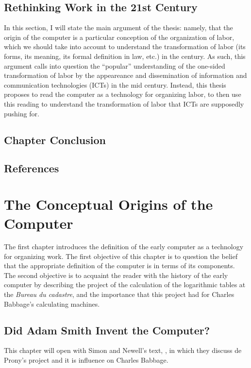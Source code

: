 \documentclass[version=last,draft=false,paper=A4,portrait,twoside=true,twocolumn=true,headinclude=false,footinclude=false,fontsize=12,BCOR=20mm,DIV=13,pagesize=auto,titlepage=firstiscover,mpinclude=false,open=right,chapterprefix=true,numbers=autoendperiod,headsepline=false,parskip=false]{scrbook}
\begin{document}
\section{Rethinking Work in the 21st Century}
\label{sec:orgb75519b}
In this section, I will state the main argument of the thesis: namely, that
the origin of the computer is a particular conception of the organization
of labor, which we should take into account to understand the transformation
of labor (its forms, its meaning, its formal definition in law, etc.) in the
 century. As such, this argument calls into question the ``popular''
understanding of the one-sided transformation of labor by the appeareance
and dissemination of information and communication technologies (ICTs) in
the mid  century. Instead, this thesis proposes to read the
computer as a technology for organizing labor, to then use this reading to
understand the transformation of labor that ICTs are supposedly pushing
for. 

\section{Chapter Conclusion}
\label{sec:orgd1898f5}
\section*{References}
\printbibliography[heading=none,keyword=chapter-1]
\chapter{The Conceptual Origins of the Computer}
\label{sec:orgf7ad317}
The first chapter introduces the definition of the early computer as a
technology for organizing work. The first objective of this chapter is to
question the belief that the appropriate definition of the computer is in
terms of its components. The second objective is to acquaint the reader
with the history of the early computer by describing the project of the
calculation of the logarithmic tables at the \emph{Bureau du cadastre}, and the
importance that this project had for Charles Babbage's calculating
machines.
\section{Did Adam Smith Invent the Computer?}
\label{sec:orga11d176}
This chapter will open with Simon and Newell's text,
, in which they discuss de Prony's project and it
is influence on Charles Babbage.
\end{document}
